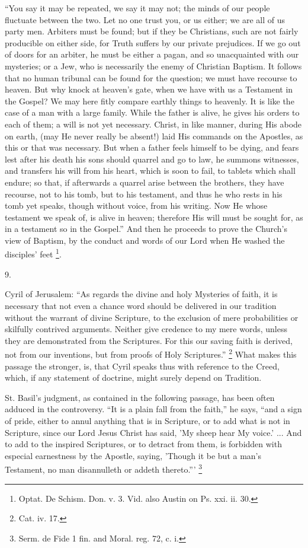 ``You say it may be repeated,
we say it may not; the minds of our people fluctuate between the two.
Let no one trust you, or us either; we are all of us party men.
Arbiters must be found; but if they be Christians, such are not fairly
producible on either side, for Truth suffers by our private
prejudices. If we go out of doors for an arbiter, he must be either a
pagan, and so unacquainted with our mysteries; or a Jew, who is
necessarily the enemy of Christian Baptism. It follows that no human
tribunal can be found for the question; we must have recourse to
heaven. But why knock at heaven's gate, when we have with us a
Testament in the Gospel? We may here fitly compare earthly things to
heavenly. It is like the case of a man with a large family. While the
father is alive, he gives his orders to each of them; a will is not
yet necessary. Christ, in like manner, during His abode on earth, (may
He never really be absent!) laid His commands on the Apostles, as this
or that was necessary. But when a father feels himself to be dying, and fears lest after his death his sons should quarrel and go
to law, he summons witnesses, and transfers his will from his heart,
which is soon to fail, to tablets which shall endure; so that, if
afterwards a quarrel arise between the brothers, they have recourse,
not to his tomb, but to his testament, and thus he who rests in his
tomb yet speaks, though without voice, from his writing. Now He whose
testament we speak of, is alive in heaven; therefore His will must be
sought for, as in a testament so in the Gospel.'' And then he
proceeds to prove the Church's view of Baptism, by the conduct and
words of our Lord when He washed the disciples' feet \footnote{Optat. De Schism. Don. v. 3. Vid. also Austin on Ps. xxi. ii.
30.}.

9.

Cyril of Jerusalem: ``As regards the divine and holy Mysteries
of faith, it is necessary that not even a chance word should be
delivered in our tradition without the warrant of divine Scripture, to
the exclusion of mere probabilities or skilfully contrived arguments.
Neither give credence to my mere words, unless they are demonstrated
from the Scriptures. For this our saving faith is derived, not from
our inventions, but from proofs of Holy Scriptures.'' \footnote{Cat. iv. 17.}
What makes this passage the stronger, is, that Cyril speaks thus with
reference to the Creed, which, if any statement of doctrine, might
surely depend on Tradition.

St. Basil's judgment, as contained in the following passage, has
been often adduced in the controversy. ``It is a plain fall from
the faith,'' he says, ``and a sign of pride, either to annul
anything that is in Scripture, or to add what is not in Scripture,
since our Lord Jesus Christ has said, 'My sheep hear My voice.' ...
And to add to the inspired Scriptures, or to detract from them,
is forbidden with especial earnestness by the Apostle, saying, 'Though
it be but a man's Testament, no man disannulleth or addeth
thereto.''' \footnote{Serm. de Fide 1 fin. and Moral. reg. 72, c.
i.}

